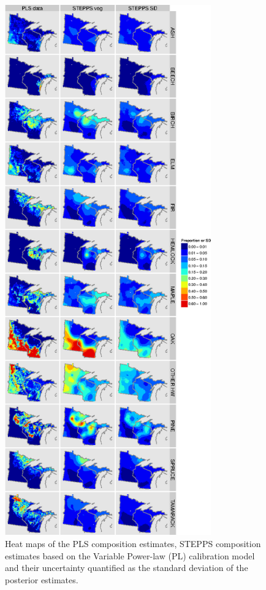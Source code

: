 \begin{figure}
\centering
\includegraphics[width=3.5in]{figures/maps_PLS_STEPPS_SD.png}
\caption{Heat maps of the PLS composition estimates, STEPPS
  composition estimates based on the Variable Power-law (PL)
  calibration model and their uncertainty quantified as the standard
  deviation of the posterior estimates.}
\label{fig:maps_pls_stepps_sd}
\end{figure}




